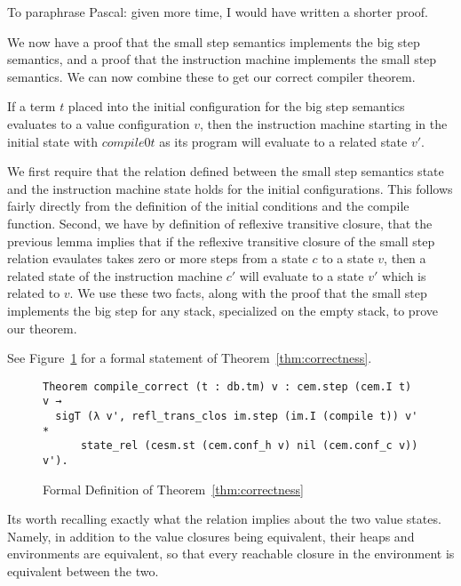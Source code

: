 To paraphrase Pascal: given more time, I would have written a shorter proof.

We now have a proof that the small step semantics implements the big step
semantics, and a proof that the instruction machine implements the small step
semantics. We can now combine these to get our correct compiler theorem. 

\begin{theorem} 
\label{thm:correctness}
If a term $t$ placed into the initial configuration for the big step semantics
evaluates to a value configuration $v$, then the instruction machine starting
in the initial state with $compile 0 t$ as its program will evaluate to a
related state $v'$.  
\end{theorem}
\begin{proofoutline}
We first require that the relation defined between the small step semantics
state and the instruction machine state holds for the initial configurations.
This follows fairly directly from the definition of the initial conditions and
the compile function. Second, we have by definition of reflexive transitive
closure, that the previous lemma implies that if the reflexive transitive
closure of the small step relation evaulates takes zero or more steps from a
state $c$ to a state $v$, then a related state of the instruction machine $c'$
will evaluate to a state $v'$ which is related to $v$. We use these two facts,
along with the proof that the small step implements the big step for any stack,
specialized on the empty stack, to prove our theorem. 
\end{proofoutline}

See Figure~\ref{fig:correctness_theorem} for a formal statement of
Theorem~\ref{thm:correctness}. 

\begin{figure}
\begin{lstlisting}
Theorem compile_correct (t : db.tm) v : cem.step (cem.I t) v → 
  sigT (λ v', refl_trans_clos im.step (im.I (compile t)) v' *
      state_rel (cesm.st (cem.conf_h v) nil (cem.conf_c v)) v').
\end{lstlisting}
\caption{Formal Definition of Theorem~\ref{thm:correctness}}
\label{fig:correctness_theorem}
\end{figure}

Its worth recalling exactly what the relation implies about the two value
states. Namely, in addition to the value closures being equivalent, their heaps
and environments are equivalent, so that every reachable closure in the
environment is equivalent between the two.


